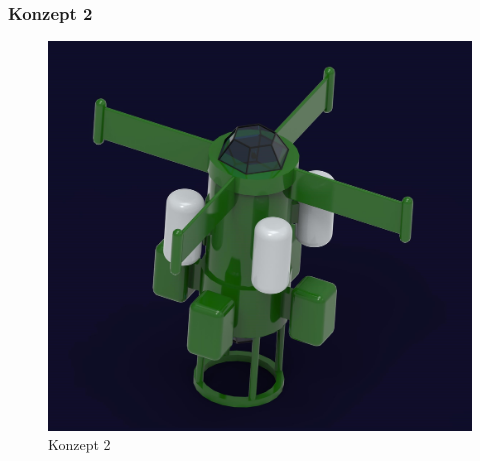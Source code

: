 \documentclass[11pt]{article}
\begin{document}
\endgroup
\subsubsection{Konzept 2}
\begingroup
\begin{figure}
\centering
  {\setlength{\belowcaptionskip}{-20pt}
    \includegraphics[width=\linewidth]{Konzept-2.jpg}
    \caption{Konzept 2}
  }
\end{figure}
\KonteptZwei

\endgroup
\end{document}
